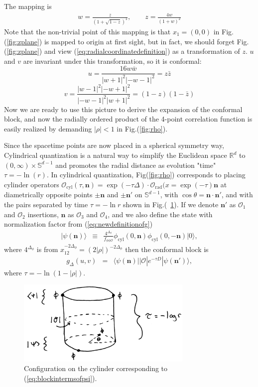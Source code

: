 \documentclass[12pt]{article}
\numberwithin{equation}{section}
\newcommand\be{\begin{eqnarray}}
\newcommand\ee{\end{eqnarray}}
\newcommand\f\phi
\newcommand\cO{\mathcal{O}}
\newcommand\<\langle
\renewcommand\>\rangle
\renewcommand\.{\cdot}
\newcommand\De{\Delta}
\newcommand\bn{\mathbf{n}}
\renewcommand\th{\theta}
\begin{document}
The mapping is
\be
\label{eq:radialcoordinatedefinition}
w = \frac{z}{(1+\sqrt{1-z})^2},\qquad z = \frac{4w}{(1+w)^2}
\ee
Note that the non-trivial point of this mapping is that $x_1 = (0,0)$ in Fig.(\ref{fig:zplane}) is mapped to origin at first sight, but in fact, we should forget Fig.(\ref{fig:zplane}) and view (\ref{eq:radialcoordinatedefinition}) as a transformation of $z$. $u$ and $v$ are invariant under this transformation, so it is conformal:
\[
u = \frac{16w\bar{w}}{|w+1|^2|-w-1|^2} = z\bar z
\]
\[
v = \frac{|w-1|^2|-w+1|^2}{|-w-1|^2|w+1|^2} = (1-z)(1-\bar z)
\]
Now we are ready to use this picture to derive the expansion of the conformal block, and now the radially ordered product of the 4-point correlation function is easily realized by demanding $|\rho|<1$ in Fig.(\ref{fig:rho}).

Since the spacetime points are now placed in a spherical symmetry way, Cylindrical quantization is a natural way to simplify the Euclidean space $\mathbb{R}^d$ to $(0, \infty) \times \mathbb{S}^{d-1}$ and promotes the radial distance as evolution "time" $\tau = -\ln(r)$. In cylindrical quantization, Fig(\ref{fig:rho}) corresponds to placing cylinder operators $\cO_{\text{cyl}}(\tau, \bn) = \exp(-\tau\Delta)\.\cO_{\text{rad}}(x=\exp(-\tau)\bn$ at diametrically opposite points $\pm \bn$ and $\pm \bn'$ on $\mathbb{S}^{d-1}$, with $\cos\th=\bn\.\bn'$, and with the pairs separated by time $\tau= -\ln r$ shown in Fig.(~\ref{fig:cylinderconfig}). If we denote $\bn'$ as $\cO_{1}$ and $\cO_{2}$ insertions, $\bn$ as $\cO_3$ and $\cO_4$, and we also define the state with normalization factor from (\ref{eq:newdefinitionofg})
\be
|\psi(\bn)\> &\equiv& \frac{4^{\De_\f}}{f_{\f\f\cO}}\phi_\mathrm{cyl}(0,\bn)\phi_\mathrm{cyl}(0,-\bn)|0\>,
\ee
where $4^{\De_\f}$ is from $x_{12}^{-2\De_\f} = (2|\rho|)^{-2\De_{\f}}$ then the conformal block is
\be
\label{eq:blockintermsofpsi}
 g_{\De}(u,v) &=& \<\psi(\bn)||\cO|e^{-\tau D}|\psi(\bn')\>,
\ee
where $\tau = -\ln(1-|\rho|)$.

\begin{figure}[h]
\begin{center}
\includegraphics[width=0.75\textwidth]{cylinderconfig.jpg}
\end{center}
\caption{Configuration on the cylinder corresponding to (\ref{eq:blockintermsofpsi}).  \label{fig:cylinderconfig}}
\end{figure}
\end{document}
